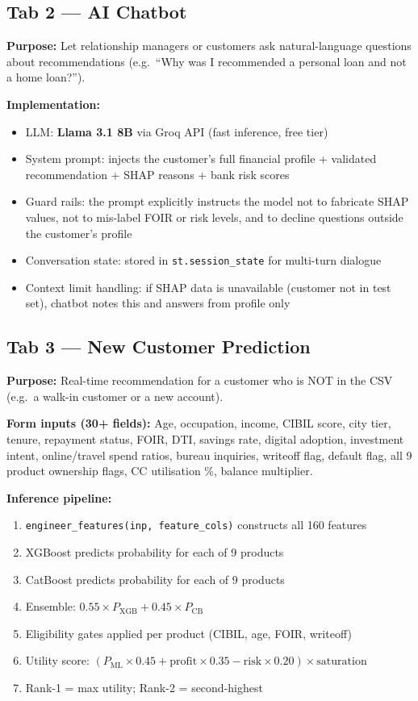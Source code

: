 \documentclass[12pt,a4paper]{article}
\begin{document}
\subsection{Tab 2 — AI Chatbot}

\textbf{Purpose:} Let relationship managers or customers ask natural-language questions about recommendations (e.g.\ ``Why was I recommended a personal loan and not a home loan?'').

\textbf{Implementation:}
\begin{itemize}[leftmargin=*,itemsep=2pt]
  \item LLM: \textbf{Llama 3.1 8B} via Groq API (fast inference, free tier)
  \item System prompt: injects the customer's full financial profile + validated recommendation + SHAP reasons + bank risk scores
  \item Guard rails: the prompt explicitly instructs the model not to fabricate SHAP values, not to mis-label FOIR or risk levels, and to decline questions outside the customer's profile
  \item Conversation state: stored in \texttt{st.session\_state} for multi-turn dialogue
  \item Context limit handling: if SHAP data is unavailable (customer not in test set), chatbot notes this and answers from profile only
\end{itemize}

\subsection{Tab 3 — New Customer Prediction}

\textbf{Purpose:} Real-time recommendation for a customer who is NOT in the CSV (e.g.\ a walk-in customer or a new account).

\textbf{Form inputs (30+ fields):}
Age, occupation, income, CIBIL score, city tier, tenure, repayment status, FOIR, DTI, savings rate, digital adoption, investment intent, online/travel spend ratios, bureau inquiries, writeoff flag, default flag, all 9 product ownership flags, CC utilisation \%, balance multiplier.

\textbf{Inference pipeline:}
\begin{enumerate}[leftmargin=*,itemsep=1pt]
  \item \texttt{engineer\_features(inp, feature\_cols)} constructs all 160 features
  \item XGBoost predicts probability for each of 9 products
  \item CatBoost predicts probability for each of 9 products
  \item Ensemble: $0.55 \times P_\text{XGB} + 0.45 \times P_\text{CB}$
  \item Eligibility gates applied per product (CIBIL, age, FOIR, writeoff)
  \item Utility score: $(P_\text{ML}\times0.45 + \text{profit}\times0.35 - \text{risk}\times0.20)\times\text{saturation}$
  \item Rank-1 = max utility; Rank-2 = second-highest
\end{enumerate}
\end{document}
